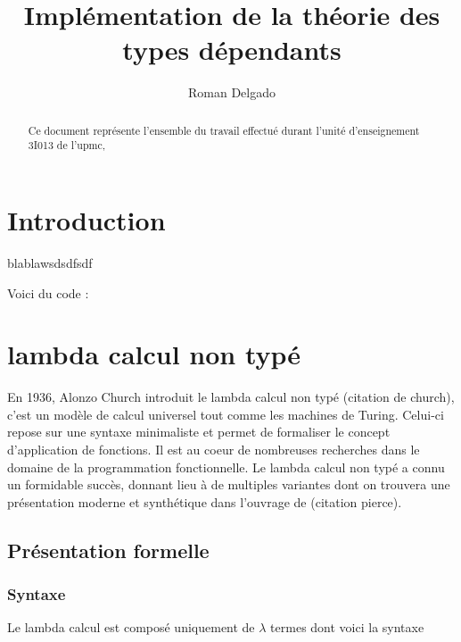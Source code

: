 \documentclass {article}
\title{Implémentation de la théorie des types dépendants}
\author{Roman Delgado}
\date{}
\newcommand{\codefrom}[3]
           {}
\theoremstyle{definition}
\theoremstyle{remark}
\begin{document}
\maketitle




\begin{abstract} 
  Ce document représente l'ensemble du travail effectué durant l'unité d'enseignement 3I013 de l'upmc,
\end{abstract}

\tableofcontents

\clearpage


\section{Introduction}

blablawsdsdfsdf


Voici du code :


\section{lambda calcul non typé}

En 1936, Alonzo Church introduit le lambda calcul non typé
(citation de church), c'est
un modèle de calcul universel tout comme les machines de Turing. Celui-ci repose
sur une syntaxe minimaliste et permet de formaliser le concept d'application 
de fonctions. Il est au coeur de nombreuses recherches dans le domaine de la 
programmation fonctionnelle. Le lambda calcul non typé a connu un formidable 
succès, donnant lieu à de multiples variantes dont on trouvera une présentation
 moderne et synthétique dans l'ouvrage de (citation pierce).

\subsection{Présentation formelle}

\subsubsection{Syntaxe}
Le lambda calcul est composé uniquement de \(\lambda\) termes dont voici la syntaxe
\end{document}
